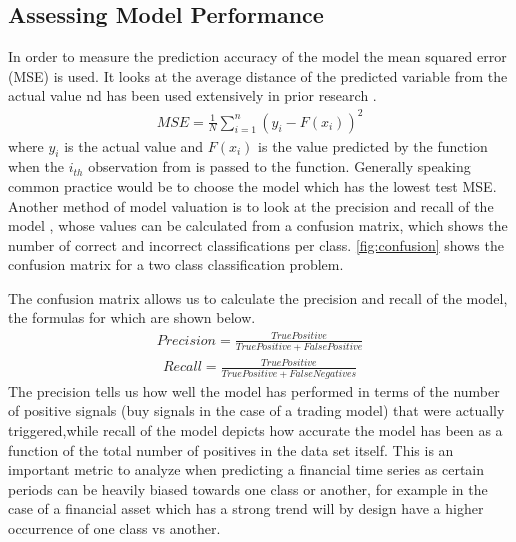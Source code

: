 \documentclass[12pt, a4paper]{article}
\begin{document}
\subsection{Assessing Model Performance}
In order to measure the prediction accuracy of the model the mean squared error (MSE) is used. It looks at the average distance of the predicted variable from the actual value nd has been used extensively in prior research \cite{Fischer2017} \cite{Nguyen2013} \cite{} \cite{} .
\begin{align}
MSE = \frac{1}{N}\sum^{n}_{i = 1} (y_{i}-F(x_{i}))^{2} 
\end{align}
where $y_{i}$ is the actual value and $F(x_{i})$ is the value predicted by the function when the $i_{th}$ observation from is passed to the function. Generally speaking common practice would be to choose the model which has the lowest test MSE. \newline Another method of model valuation is to look at the precision and recall of the model \cite{Patel2014}, whose values can be calculated from a confusion matrix, which shows the number of correct and incorrect classifications per class. \ref{fig:confusion}  shows the confusion matrix for a two class classification problem.
\begin{table}[h] 
\centering      %
\caption{Confusion Matrix} %
\label{table:confusion} %
\end{table} 

The confusion matrix allows us to calculate the precision and recall of the model, the formulas for which are shown below.
\begin{align}
Precision = \frac{True Positive}{True Positive + False Positive} 
\end{align}
\begin{align}
Recall = \frac{True Positive}{True Positive + False Negatives} 
\end{align}
The precision tells us how well the model has performed in terms of the number of positive signals (buy signals in the case of a trading model) that were actually triggered,while recall of the model depicts how accurate the model has been as a function of the total number of positives in the data set itself. This is an important metric to analyze when predicting a financial time series as certain periods can be heavily biased towards one class or another, for example in the case of a financial asset which has a strong trend will by design have a higher occurrence of one class vs another.
\end{document}
